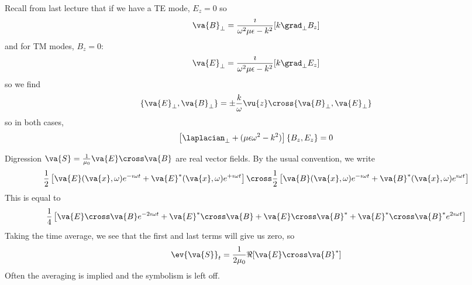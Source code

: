 \documentclass[a4paper,twoside,master.tex]{subfiles}
\begin{document}

Recall from last lecture that if we have a TE mode, $ E_z = 0 $ so
\begin{equation}
    \va{B}_\perp = \frac{\imath}{\omega^2 \mu \epsilon - k^2} [k \grad_{\perp}{B_z}]
\end{equation}
and for TM modes, $ B_z = 0 $:
\begin{equation}
    \va{E}_\perp = \frac{\imath}{\omega^2 \mu \epsilon - k^2} [k \grad_{\perp}{E_z}]
\end{equation}
so we find
\begin{equation}
    \{\va{E}_{\perp},\va{B}_{\perp}\} = \pm \frac{k}{\omega} \vu{z} \cross \{ \va{B}_{\perp}, \va{E}_{\perp}\}
\end{equation}
so in both cases,
\begin{equation}
    \left[ \laplacian_{\perp} + (\mu \epsilon \omega^2 - k^2) \right] \{ B_z, E_z\} = 0
\end{equation}

\begin{note}{Digression}
    $ \va{S} = \frac{1}{\mu_0} \va{E} \cross \va{B} $ are real vector fields. By the usual convention, we write
    \begin{equation}
        \frac{1}{2} \left[ \va{E}( \va{x}, \omega) e^{- \imath \omega t} + \va{E}^*( \va{x}, \omega) e^{+ \imath \omega t} \right] \cross \frac{1}{2} \left[ \va{B}( \va{x}, \omega) e^{- \imath \omega t} + \va{B}^*( \va{x}, \omega) e^{\imath \omega t} \right]
    \end{equation}
    This is equal to
    \begin{equation}
        \frac{1}{4} \left[ \va{E} \cross \va{B} e^{-2 \imath \omega t} + \va{E}^* \cross \va{B} + \va{E} \cross \va{B}^* + \va{E}^* \cross \va{B}^* e^{2 \imath \omega t} \right]
    \end{equation}
    Taking the time average, we see that the first and last terms will give us zero, so
    \begin{equation}
        \ev{ \va{S}}_{t} = \frac{1}{2 \mu_0} \Re[ \va{E} \cross \va{B}^*]
    \end{equation}
    Often the averaging is implied and the symbolism is left off.
\end{note}
\end{document}
